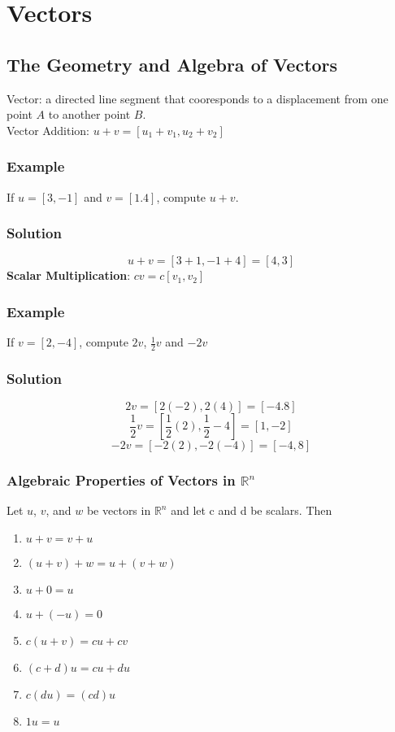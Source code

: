 \setcounter{chapter}{0}
\chapter{Vectors}

\section{The Geometry and Algebra of Vectors}
Vector: a directed line segment that cooresponds to a displacement from one point $A$ to another point $B$. \\
Vector Addition: $u+v = [u_1+v_1, u_2+v_2]$
\subsection*{Example}
If $u = [3,-1]$ and $v = [1.4]$, compute $u+v$.
\subsection*{Solution}
$$u+v = [3+1, -1+4] = [4,3]$$
\textbf{Scalar Multiplication}: $cv = c[v_1, v_2]$
\subsection*{Example}
If $v = [2, -4]$, compute $2v$, $\frac{1}{2}v$ and $-2v$
\subsection*{Solution}
$$2v = [2(-2), 2(4)] = [-4.8]$$
$$\frac{1}{2}v = [\frac{1}{2}(2), \frac{1}{2}-4] = [1,-2]$$
$$-2v = [-2(2), -2(-4)] = [-4, 8]$$
\subsection*{Algebraic Properties of Vectors in $\mathbb{R}^n$}
Let $u$, $v$, and $w$ be vectors in $\mathbb{R}^n$ and let c and d be scalars. Then
\begin{enumerate}
    \item $u+v = v+u$
    \item $(u+v)+w = u + (v+w)$
    \item $u+0 = u$
    \item $u + (-u) = 0$
    \item $c(u+v) = cu + cv$
    \item $(c+d)u = cu + du$
    \item $c(du) = (cd)u$
    \item $1u = u$
\end{enumerate}
